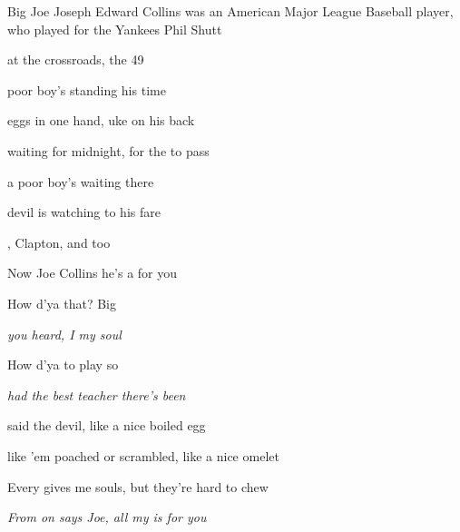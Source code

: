 \begin{SBSong}{Big Joe}
    {Joseph Edward Collins was an American Major League Baseball player, who played for the Yankees}
    {Phil Shutt}
  \begin{SBVerse}
     at the crossroads,  the 49
	
	  poor boy's standing  his time

     eggs in one hand,  uke on his back
	
     waiting for midnight, for the  to pass
	
	  a poor boy's  waiting there
	
	  devil is watching to  his fare

    , Clapton, and  too
	
	 Now  Joe Collins he's a  for you
  \end{SBVerse}
  \begin{SBChorus}
    How d'ya  that?  Big 
	
	 \emph{ you heard, I  my soul}
	
	 How d'ya  to play so 
	
	 \emph{ had the best teacher there's  been}
  \end{SBChorus}
  \CBPageBrk
  \begin{SBVerse}
     said the devil,  like a nice boiled egg
	
	  like 'em poached or scrambled,  like a nice omelet
	
	 Every gives me souls, but they're  hard to chew
	
	 \emph{From  on says Joe, all my  is for you}
	

\end{SBVerse}
\end{SBSong}
